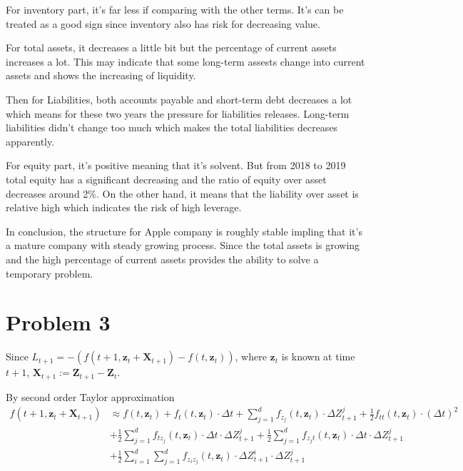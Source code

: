 \documentclass[letterpaper,11pt]{article}
\begin{document}
\begin{spacing}{1.2}
For inventory part, it's far less if comparing with the other terms. It's can be treated as a good sign since inventory also has risk for decreasing value.

For total assets, it decreases a little bit but the percentage of current assets increases a lot. This may indicate that some long-term assests change into current assets and shows the increasing of liquidity.

Then for Liabilities, both accounts payable and short-term debt decreases a lot which means for these two years the pressure for liabilities releases. Long-term liabilities didn't change too much which makes the total liabilities decreases apparently.

For equity part, it's positive meaning that it's solvent. But from 2018 to 2019 total equity has a significant decreasing and the ratio of equity over asset decreases around 2\%. On the other hand, it means that the liability over asset is relative high which indicates the risk of high leverage.

In conclusion, the structure for Apple company is roughly stable impling that it's a mature company with steady growing process. Since the total assets is growing and the high percentage of current assets provides the ability to solve a temporary problem.

\section*{Problem 3}

Since $L_{t+1} = -(f(t+1,\bm{z}_t + \bm{X}_{t+1}) - f(t,\bm{z}_t))$, where $\bm{z}_t$ is known at time $t+1$, $\bm{X}_{t+1} := \bm{Z}_{t+1} - \bm{Z}_t.$

By second order Taylor approximation
\begin{equation}
\begin{aligned}
f(t+1,\bm{z}_t + \bm{X}_{t+1}) &\approx f(t,\bm{z}_t) + f_t(t,\bm{z}_t) \cdot \Delta t + \sum_{j=1}^d f_{z_j}(t,\bm{z}_t) \cdot \Delta Z_{t+1}^j + \frac{1}{2} f_{tt}(t,\bm{z}_t) \cdot (\Delta t)^2 \\
&+ \frac{1}{2} \sum_{j=1}^d f_{tz_j}(t,\bm{z}_t) \cdot \Delta t \cdot \Delta Z_{t+1}^j + \frac{1}{2} \sum_{j=1}^d f_{z_jt}(t,\bm{z}_t) \cdot \Delta t \cdot \Delta Z_{t+1}^j \\
&+ \frac{1}{2} \sum_{i=1}^d \sum_{j=1}^d f_{z_iz_j}(t,\bm{z}_t) \cdot \Delta Z_{t+1}^i \cdot \Delta Z_{t+1}^j
\end{aligned}
\end{equation}


\end{spacing}
\end{document}
